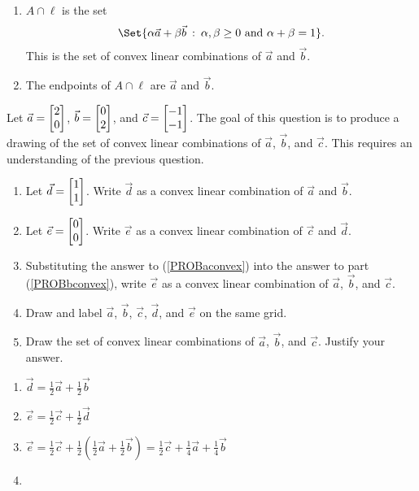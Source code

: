 \begin{exercises}
\begin{problist}
\begin{solution}
\begin{enumerate}
				\item $A \cap \ell$ is the set
				\[
					\Set{\alpha \vec a+\beta \vec b\given \alpha,\beta \geq 0\text{ and }
					\alpha+\beta = 1}.
				\]
				This is the set of convex linear
				combinations of $\vec a$ and $\vec b$. 
				\item The endpoints of $A\cap\ell$ are $\vec{a}$ and $\vec{b}$.
			\end{enumerate}
		\end{solution}
		\prob
		Let $\vec a=\mat{2 \\0}$, $\vec b=\mat{0 \\ 2}$, and $\vec c=\mat{-1 \\ -1}$. 
		The goal of this question is to produce a drawing of the set of 
		convex linear combinations of $\vec a$, $\vec b$, and $\vec c$. This requires an understanding of the previous question.
		\begin{enumerate}
			\item \label{PROBaconvex} Let $\vec d=\mat{1 \\ 1}$. Write $\vec d$ as a convex
				linear combination of $\vec a$ and $\vec b$.
			\item \label{PROBbconvex} Let $\vec e=\mat{0 \\ 0}$. Write $\vec e$ as a convex 
				linear combination of $\vec c$ and $\vec d$.
			\item Substituting the answer to (\ref{PROBaconvex}) into the answer to part
				(\ref{PROBbconvex}), write $\vec e$ as a convex linear combination of $\vec a$, $\vec b$, and $\vec c$.
			\item Draw and label $\vec a$, $\vec b$, $\vec c$, $\vec d$, and
				$\vec e$ on the same grid.
			\item Draw the set of convex linear combinations of $\vec a$, $\vec b$, 
				and $\vec c$. Justify your answer.
		\end{enumerate}
		\begin{solution}
			\begin{enumerate}
				\item $\vec{d} = \tfrac{1}{2}\vec{a} + \tfrac{1}{2}\vec{b}$
				\item $\vec{e} = \tfrac{1}{2}\vec{c} + \tfrac{1}{2}\vec{d}$
				\item
				$\vec{e}=\tfrac{1}{2}\vec{c}+\tfrac{1}{2}(\tfrac{1}{2}\vec{a}+\tfrac{1}{2}\vec{b})
						=\tfrac{1}{2}\vec{c}+\tfrac{1}{4}\vec{a}+\tfrac{1}{4}\vec{b}
				$
				\item 
				\begin{tikzpicture}[baseline = (current bounding box.north)]

\end{tikzpicture}
\end{enumerate}
\end{solution}
\end{problist}
\end{exercises}
